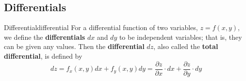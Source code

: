 \documentclass[math,code]{amznotes}
\theoremstyle{remark}
\begin{document}
\subsection{Differentials}
\begin{dfnbox}{Differential}{differential}
    For a differential function of two variables, $z=f(x,y)$, we define the {\color{red} \textbf{differentials}} $dx$ and $dy$ to be independent variables; that is, they can be given any values. Then the {\color{red} \textbf{differential}} $dz$, also called the {\color{red} \textbf{total differential}}, is defined by
    \begin{equation} \label{eq:two-varaibles-differentials}
        dz=f_x(x,y)dx+f_y(x,y)dy=\frac{\partial z}{\partial x}\cdot dx+\frac{\partial z}{\partial y}\cdot dy
    \end{equation}
\end{dfnbox}
\end{document}
